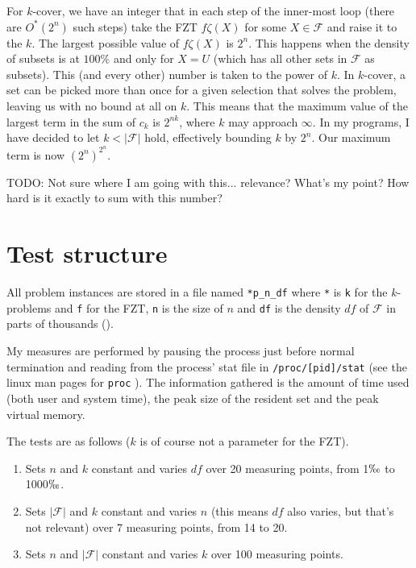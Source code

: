 \documentclass[a4paper, titlepage]{article}
\newcommand{\code}{\texttt}
\begin{document}
For $k$-cover, we have an integer that in each step of the inner-most loop (there are $O^*(2^n)$ such steps) take the FZT $f\zeta(X)$ for some $ X \in \mathcal{F}$ and raise it to the $k$. The largest possible value of $f\zeta(X)$ is $2^n$. This happens when the density of subsets is at $100\%$ and only for $X=U$ (which has all other sets in $\mathcal{F}$ as subsets). This (and every other) number is taken to the power of $k$. In $k$-cover, a set can be picked more than once for a given selection that solves the problem, leaving us with no bound at all on $k$. This means that the maximum value of the largest term in the sum of $c_k$ is $2^{nk}$, where $k$ may approach $\infty$. In my programs, I have decided to let $k < |\mathcal{F}|$ hold, effectively bounding $k$ by $2^n$. Our maximum term is now $(2^n)^{2^n}$. 

TODO: Not sure where I am going with this... relevance? What's my point? How hard is it exactly to sum with this number? 

\section{Test structure}
All problem instances are stored in a file named \code{*p\_n\_df} where \code{*} is \code{k} for the $k$-problems and \code{f} for the FZT, \code{n} is the size of $n$ and \code{df} is the density $df$ of $\mathcal{F}$ in parts of thousands (\permil).

My measures are performed by pausing the process just before normal termination and reading from the process' stat file in \code{/proc/[pid]/stat} (see the linux man pages for \code{proc} \cite{proc}). The information gathered is the amount of time used (both user and system time), the peak size of the resident set and the peak virtual memory.

The tests are as follows ($k$ is of course not a parameter for the FZT).

\begin{enumerate}
 \item Sets $n$ and $k$ constant and varies $df$ over 20 measuring points, from 1$\permil$ to 1000$\permil$.
 \item Sets $|\mathcal{F}|$ and $k$ constant and varies $n$ (this means $df$ also varies, but that's not relevant) over 7 measuring points, from 14 to 20.
 \item Sets $n$ and $|\mathcal{F}|$ constant and varies $k$ over 100 measuring points.

\end{enumerate}
\end{document}
